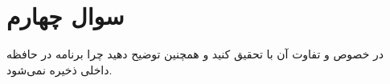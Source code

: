 \section{سوال چهارم}

در خصوص  و تفاوت آن با  تحقیق کنید و همچنین توضیح دهید چرا برنامه  در حافظه داخلی ذخیره نمی‌شود.


\begin{qsolve}[]
	
\end{qsolve}